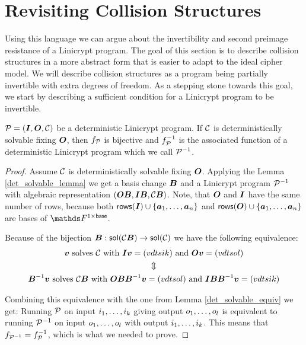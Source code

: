 \section{Revisiting Collision Structures}

Using this language we can argue about the invertibility and second preimage resistance of a Linicrypt program.
The goal of this section is to describe collision structures in a more abstract form 
that is easier to adapt to the ideal cipher model.
We will describe collision structures as a program being partially invertible with extra degrees of freedom.
As a stepping stone towards this goal, we start by describing a sufficient condition for a Linicrypt program to be invertible.

\begin{lemma}
\label{inversion}
    $\P = (\I, \O, \C)$ be a deterministic Linicrypt program.
    If $\C$ is deterministically solvable fixing $\O$,
    then $f_\P$ is bijective and $f_\P^{-1}$ is the associated function of a deterministic Linicrypt program which we call $\P^{-1}$.
\end{lemma}

\begin{proof}
Assume $\C$ is deterministically solvable fixing $\O$.
Applying the Lemma \ref{det_solvable_lemma} we get a basis change $\B$
and a Linicrypt program $\P^{-1}$ with algebraic representation $(\O \B, \I \B, \C \B)$.
Note, that $\O$ and $\I$ have the same number of rows, because both $\rows(\I) \cup \{\dts \va n\}$ and
$\rows(\O) \cup \{\dts \va n\}$ are bases of $\F^{1\times\base}$.

Because of the bijection $\B: \sol(\C\B) \to \sol(\C)$ we have the following equivalence:
\begin{gather*}
    \vv \textrm{ solves } \C \textrm{ with }
    \I \vv = \vec i k \textrm{ and } \O \vv = \vec o l \\
    \Updownarrow \\
    \B^{-1} \vv \textrm{ solves } \C \B \textrm{ with }
    \O \B \B^{-1} \vv = \vec o l  \textrm{ and }\I \B \B^{-1} \vv = \vec i k  
\end{gather*}

Combining this equivalence with the one from Lemma \ref{det_solvable_equiv} we get:
Running $\P$ on input $\dts i k$ giving output $\dts o l$ is equivalent to running 
$\P^{-1}$ on input $\dts o l$ with output $\dts i k$.
This means that $f_{\P^{-1}} = f_\P^{-1}$, which is what we needed to prove.
\end{proof}

